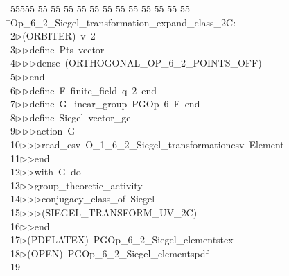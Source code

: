 %
%
\begin{tabbing}
55555 \= 55 \= 55 \= 55 \= 55 \= 55 \= 55 \= 55 \= 55 \= 55 \= 55 \= 55 \= 55 \= \>Op\_6\_2\_Siegel\_transformation\_expand\_class\_2C:\\[0pt]
2\>$\triangleright$\>(ORBITER)\ v\ 2\ \\[0pt]
3\>$\triangleright$\>$\triangleright$\>define\ Pts\ vector\ \\[0pt]
4\>$\triangleright$\>$\triangleright$\>$\triangleright$\>dense\ (ORTHOGONAL\_OP\_6\_2\_POINTS\_OFF)\ \\[0pt]
5\>$\triangleright$\>$\triangleright$\>end\ \\[0pt]
6\>$\triangleright$\>$\triangleright$\>define\ F\ finite\_field\ q\ 2\ end\ \\[0pt]
7\>$\triangleright$\>$\triangleright$\>define\ G\ linear\_group\ PGOp\ 6\ F\ end\ \\[0pt]
8\>$\triangleright$\>$\triangleright$\>define\ Siegel\ vector\_ge\ \\[0pt]
9\>$\triangleright$\>$\triangleright$\>$\triangleright$\>action\ G\ \\[0pt]
10\>$\triangleright$\>$\triangleright$\>$\triangleright$\>read\_csv\ O\_1\_6\_2\_Siegel\_transformationcsv\ Element\ \\[0pt]
11\>$\triangleright$\>$\triangleright$\>end\ \\[0pt]
12\>$\triangleright$\>$\triangleright$\>with\ G\ do\ \\[0pt]
13\>$\triangleright$\>$\triangleright$\>group\_theoretic\_activity\ \\[0pt]
14\>$\triangleright$\>$\triangleright$\>$\triangleright$\>conjugacy\_class\_of\ Siegel\ \\[0pt]
15\>$\triangleright$\>$\triangleright$\>$\triangleright$\>(SIEGEL\_TRANSFORM\_UV\_2C)\ \\[0pt]
16\>$\triangleright$\>$\triangleright$\>end\\[0pt]
17\>$\triangleright$\>(PDFLATEX)\ PGOp\_6\_2\_Siegel\_elementstex\\[0pt]
18\>$\triangleright$\>(OPEN)\ PGOp\_6\_2\_Siegel\_elementspdf\\[0pt]
19\>\end{tabbing}
